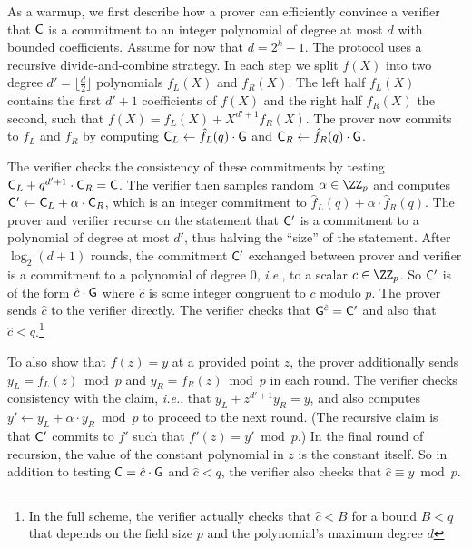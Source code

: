 As a warmup, we first describe how a prover can efficiently convince a verifier that $\gr{C}$ is a commitment to an integer polynomial of degree at most $d$ with bounded coefficients. Assume for now that $d=2^k-1$. The protocol uses a recursive divide-and-combine strategy. 
In each step we split $f(X)$ into two degree $d'=\lfloor\frac{d}{2}\rfloor$ polynomials $f_L(X)$ and $f_R(X)$. 
The left half $f_L(X)$ contains the first $d'+1$ coefficients of $f(X)$ and the right half $f_R(X)$ the second, such that $f(X)=f_L(X)+X^{d'+1}f_R(X)$. The prover now commits to $f_L$ and $f_R$ by computing $\gr{C}_L\gets {\hat{f}_L(q)}\cdot \gr{g}$ and $\gr{C}_R\gets {\hat{f}_R(q)}\cdot \gr{g}$.
\begin{comment}
In our running example, $f_L(X)=4X+1$ and $f_R(X)=2X+3$. 
\end{comment} 
The verifier checks the consistency of these commitments by testing $\gr{C}_L+q^{d'+1}\cdot \gr{C}_R=\gr{C}$. The verifier then samples random  $\alpha \in \ZZ_p$ and computes $\gr{C}'\gets \gr{C}_L+{\alpha}\cdot \gr{C}_R$, which is an integer commitment to $\hat{f}_L(q) +{\alpha}\cdot  \hat{f}_R(q)$. The prover and verifier recurse on the statement that $\gr{C}'$ is a commitment to a polynomial of degree at most $d'$, thus halving the ``size'' of the statement. %
After $\log_2(d+1)$ rounds, the commitment $\gr{C}'$ exchanged between prover and verifier is a commitment to a polynomial of degree $0$, \emph{i.e.}, to a scalar $c \in \ZZ_p$. So $\gr{C}'$ is of the form ${\hat{c}}\cdot \gr{g}$ where $\hat{c}$ is some integer congruent to $c$ modulo $p$. 
The prover sends $\hat{c}$ to the verifier directly. 
The verifier checks that $\gr{g}^{\hat{c}} = \gr{C}'$ and also that $\hat{c} < q$.\footnote{In the full scheme, the verifier actually checks that $\hat{c} < B$ for a bound $B < q$ that depends on the field size $p$ and the polynomial's maximum degree $d$} 

To also show that $f(z) = y$ at a provided point $z$, the prover additionally sends $y_L=f_L(z)\bmod p$ and $y_R=f_R(z)\bmod p$ in each round. The verifier checks consistency with the claim, \emph{i.e.}, that $y_L+z^{d'+1}y_R=y$, and also computes $y' \leftarrow  y_L+ \alpha \cdot y_R\bmod p$ to proceed to the next round. (The recursive claim is that $\gr{C}'$ commits to $f'$ such that $f'(z) = y' \bmod p$.) In the final round of recursion, the value of the constant polynomial in $z$ is the constant itself. So in addition to testing $\gr{C} = {\hat{c}}\cdot \gr{g}$ and $\hat{c} < q$, the verifier also checks that $\hat{c} \equiv y \bmod p$.

